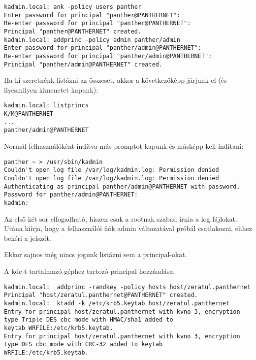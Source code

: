 \begin{Verbatim}[frame=single,label=Felhasználók hozzáadása]
kadmin.local: ank -policy users panther
Enter password for principal "panther@PANTHERNET":
Re-enter password for principal "panther@PANTHERNET":
Principal "panther@PANTHERNET" created.
kadmin.local: addprinc -policy admin panther/admin
Enter password for principal "panther/admin@PANTHERNET":
Re-enter password for principal "panther/admin@PANTHERNET":
Principal "panther/admin@PANTHERNET" created.
\end{Verbatim}



Ha ki szeretnénk listázni az összeset, akkor a következőképp járjunk el (és ilyesmilyen kimenetet kapunk):

\begin{Verbatim}[frame=single]
kadmin.local: listprincs
K/M@PANTHERNET
...
panther/admin@PANTHERNET
\end{Verbatim}


Normál felhasználóként indítva más promptot kapunk és másképp kell indítani:

\begin{Verbatim}[frame=single,label=Normál felhasználóként indítva]
panther ~ > /usr/sbin/kadmin
Couldn't open log file /var/log/kadmin.log: Permission denied
Couldn't open log file /var/log/kadmin.log: Permission denied
Authenticating as principal panther/admin@PANTHERNET with password.
Password for panther/admin@PANTHERNET:
kadmin:
\end{Verbatim}

Az első két sor elfogadható, hiszen csak a rootnak szabad írnia a log fájlokat. Utána kiírja, hogy a felhasználói fiók
admin változatával próbál csatlakozni, ehhez bekéri a jelszót.

Ekkor sajnos még nincs jogunk listázni sem a principal-okat.

A kdc-t tartalmazó géphez tartozó principal hozzáadása:

\begin{Verbatim}[frame=single]
kadmin.local:  addprinc -randkey -policy hosts host/zeratul.panthernet
Principal "host/zeratul.panthernet@PANTHERNET" created.
kadmin.local:  ktadd -k /etc/krb5.keytab host/zeratul.panthernet
Entry for principal host/zeratul.panthernet with kvno 3, encryption
type Triple DES cbc mode with HMAC/sha1 added to
keytab WRFILE:/etc/krb5.keytab.
Entry for principal host/zeratul.panthernet with kvno 3, encryption
type DES cbc mode with CRC-32 added to keytab
WRFILE:/etc/krb5.keytab.
\end{Verbatim}


